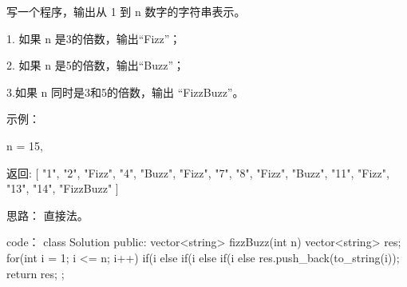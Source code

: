 写一个程序，输出从 1 到 n 数字的字符串表示。

1. 如果 n 是3的倍数，输出“Fizz”；

2. 如果 n 是5的倍数，输出“Buzz”；

3.如果 n 同时是3和5的倍数，输出 “FizzBuzz”。

示例：

n = 15,

返回:
[
    "1",
    "2",
    "Fizz",
    "4",
    "Buzz",
    "Fizz",
    "7",
    "8",
    "Fizz",
    "Buzz",
    "11",
    "Fizz",
    "13",
    "14",
    "FizzBuzz"
]
























思路：
直接法。





























code：
class Solution {
public:
    vector<string> fizzBuzz(int n) {
        vector<string> res;
        for(int i = 1; i <= n; i++)
        {
            if(i %
            else if(i %
            else if(i %
            else res.push_back(to_string(i));
        }
        return res;
    }
};